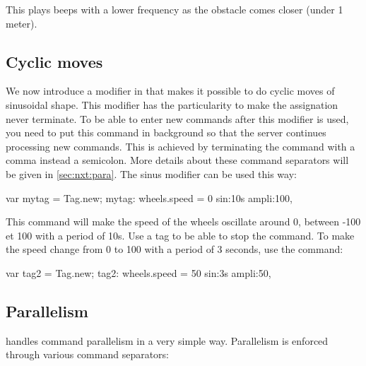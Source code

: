 This plays beeps with a lower frequency as the obstacle comes closer (under
1 meter).

\subsection{Cyclic moves}
We now introduce a modifier in \urbi that makes it possible to do cyclic
moves of sinusoidal shape. This modifier has the particularity to make the
assignation never terminate. To be able to enter new commands after this
modifier is used, you need to put this command in background so that the
\urbi server continues processing new commands. This is achieved by
terminating the command with a comma instead a semicolon. More details about
these command separators will be given in \autoref{sec:nxt:para}.  The sinus
modifier can be used this way:
\begin{urbiunchecked}
var mytag = Tag.new;
mytag: wheels.speed = 0 sin:10s ampli:100,
\end{urbiunchecked}

This command will make the speed of the wheels oscillate around 0, between -100
et 100 with a period of 10s. Use a tag to be able to stop the command. To make
the speed change from 0 to 100 with a period of 3 seconds, use the command:
\begin{urbiunchecked}
var tag2 = Tag.new;
tag2: wheels.speed = 50 sin:3s ampli:50,
\end{urbiunchecked}



\subsection{Parallelism}
\label{sec:nxt:para}
\urbi handles command parallelism in a very simple way. Parallelism is enforced
through various command separators:

